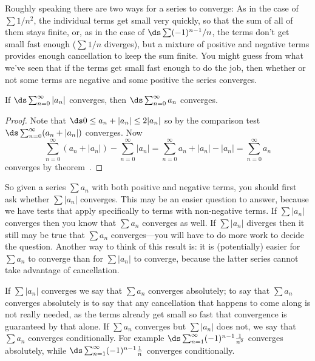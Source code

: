 
\nobreak
Roughly speaking there are two ways for a series to converge: As in
the case of $\sum 1/n^2$, the individual terms get small very quickly,
so that the sum of all of them stays finite, or, as in the case of
$\ds \sum (-1)^{n-1}/n$, the terms don't get small fast enough ($\sum 1/n$
diverges), but a mixture of positive and negative terms provides
enough cancellation to keep the sum finite. You might guess from what
we've seen that if the terms get small fast enough to do the job, then
whether or not some terms are negative and some positive the series
converges. 

\begin{theorem} If $\ds\sum_{n=0}^\infty |a_n|$ converges, then 
$\ds\sum_{n=0}^\infty a_n$ converges.
\end{theorem}
\begin{proof}
Note that $\ds 0\le a_n+|a_n|\le 2|a_n|$ so by the comparison test
$\ds\sum_{n=0}^\infty (a_n+|a_n|)$ converges. Now
$$
  \sum_{n=0}^\infty (a_n+|a_n|) -\sum_{n=0}^\infty |a_n|
  = \sum_{n=0}^\infty a_n+|a_n|-|a_n| = \sum_{n=0}^\infty a_n 
$$
converges by theorem~.
\end{proof}

So given a series $\sum a_n$ with both positive and negative terms,
you should first ask whether $\sum |a_n|$ converges. This may be an
easier question to answer, because we have tests that apply
specifically to terms with non-negative terms. If $\sum |a_n|$
converges then you know that $\sum a_n$ converges as well. If $\sum
|a_n|$ diverges then it still may be true that $\sum a_n$
converges---you will have to do more work to decide the question.
Another way to think of this result is: it is (potentially) easier for
$\sum a_n$ to converge than for $\sum |a_n|$ to converge, because the
latter series cannot take advantage of cancellation. 

If $\sum |a_n|$ converges we say that $\sum a_n$ converges {\dfont
absolutely\/}; to say that $\sum
a_n$ converges absolutely is to say that any cancellation that happens
to come along is not really needed, as the terms already get small so
fast that convergence is guaranteed by that alone. If $\sum a_n$
converges but $\sum |a_n|$ does not, we say that $\sum a_n$ converges
{\dfont conditionally}. For
example $\ds\sum_{n=1}^\infty (-1)^{n-1} {1\over n^2}$ converges
absolutely, while $\ds\sum_{n=1}^\infty (-1)^{n-1} {1\over n}$
converges conditionally.

